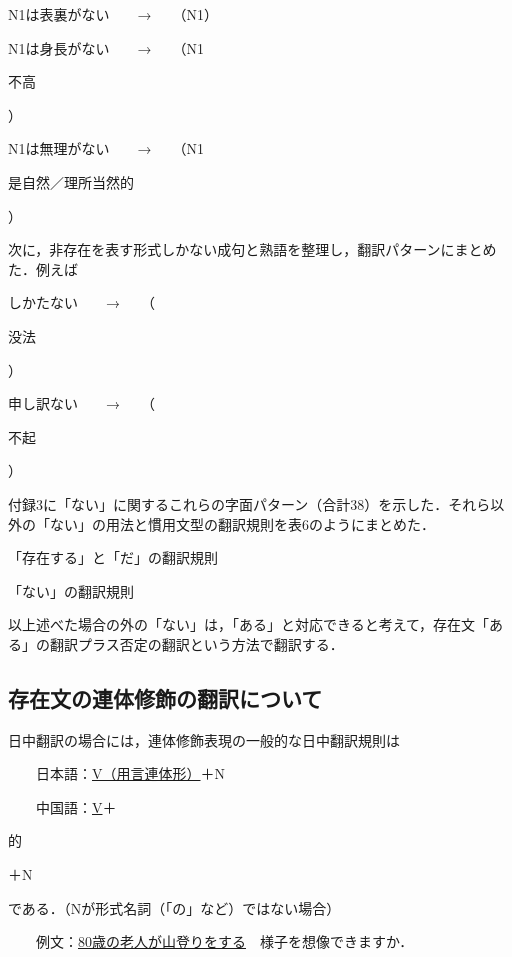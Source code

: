 \documentclass[japanese]{jnlp_1.4}
\newcommand{\inHRei}[1]{}
\begin{document}
\inHRei{(1)}
N1は表裏がない　　→　　（N1）

\inHRei{(2)}
N1は身長がない　　→　　（N1\begin{簡体中文}不高\end{簡体中文}）

\inHRei{(3)}
N1は無理がない　　→　　（N1\begin{簡体中文}是自然／理所当然的\end{簡体中文}）

次に，非存在を表す形式しかない成句と熟語を整理し，翻訳パターンにまとめた．例えば

\inHRei{(1)}
しかたない　　→　　（\begin{簡体中文}没法\end{簡体中文}）

\inHRei{(2)}
申し訳ない　　→　　（\begin{簡体中文}不起\end{簡体中文}）

付録3に「ない」に関するこれらの字面パターン（合計38）を示した．それら以外の「ない」の用法と慣用文型の翻訳規則を表6のようにまとめた．

\begin{table}[t]
\caption{「存在する」と「だ」の翻訳規則}

\end{table}
\begin{table}[t]
\caption{「ない」の翻訳規則}

\end{table}


以上述べた場合の外の「ない」は，「ある」と対応できると考えて，存在文「ある」の翻訳プラス否定の翻訳という方法で翻訳する．



\subsection{存在文の連体修飾の翻訳について}

日中翻訳の場合には，連体修飾表現の一般的な日中翻訳規則は

　　日本語：\ul{\mbox{V（用言連体形）}}＋N

　　中国語：\ul{V}＋\begin{簡体中文}的\end{簡体中文}＋N

\noindent
である．（Nが形式名詞（「の」など）ではない場合）

　　例文：\ul{\mbox{80歳の老人が山登りをする}}　様子を想像できますか．
\end{document}
